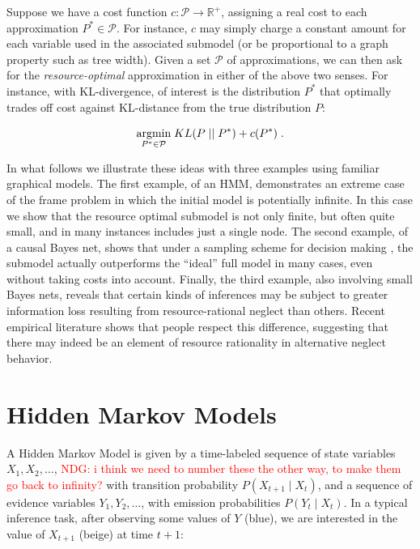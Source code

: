 \documentclass[10pt,letterpaper]{article}
\newcommand{\red}[1]{\textcolor{Red}{#1}}
\begin{document}
Suppose we have a cost function $c: \mathcal{P}\rightarrow\mathbb{R}^+$, assigning a real cost to each approximation $P^* \in \mathcal{P}$. For instance, $c$ may simply charge a constant amount for each variable used in the associated submodel (or be proportional to a graph property such as tree width). Given a set $\mathcal{P}$ of approximations, we can then ask for the \emph{resource-optimal} approximation  in either of the above two senses. For instance, with KL-divergence, of interest is the distribution $P^*$ that optimally trades off cost against KL-distance from the true distribution $P$: 

\begin{equation} \underset{P^*\in\mathcal{P}}{\textnormal{argmin}} \; KL(P\;||\;P^*) + c(P^*)\;.\label{optimal}\end{equation}


In what follows we illustrate these ideas with three examples using familiar graphical models. The first example, of an HMM, demonstrates an extreme case of the frame problem in which the initial model is potentially infinite. In this case we show that the resource optimal submodel is not only finite, but often quite small, and in many instances includes just a single node. The second example, of a causal Bayes net, shows that under a sampling scheme for decision making \citep{Vul2014}, the submodel actually outperforms the ``ideal'' full model in many cases, even without taking costs into account. Finally, the third example, also involving small Bayes nets, reveals that certain kinds of inferences may be subject to greater information loss resulting from resource-rational neglect than others. Recent empirical literature shows that people respect this difference, suggesting that there may indeed be an element of resource rationality in alternative neglect behavior.

\section{Hidden Markov Models}

A Hidden Markov Model is given by a time-labeled sequence of state variables $X_1,X_2,\dots$, \red{NDG: i think we need to number these the other way, to make them go back to infinity?} with transition probability $P(X_{t+1}\mid X_t)$, and a sequence of evidence variables $Y_1,Y_2,\dots$, with emission probabilities $P(Y_t\mid X_t)$. In a typical inference task, after observing some values of $Y$ (blue), we are interested in the value of $X_{t+1}$ (beige) at time $t+1$:
\end{document}
